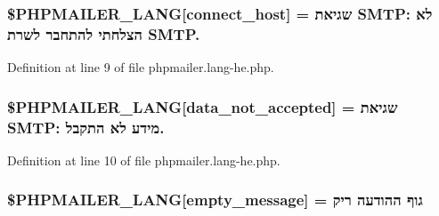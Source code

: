 \subsubsection[{\texorpdfstring{\$\+P\+H\+P\+M\+A\+I\+L\+E\+R\+\_\+\+L\+A\+NG}{$PHPMAILER_LANG}}]{\setlength{\rightskip}{0pt plus 5cm}\$P\+H\+P\+M\+A\+I\+L\+E\+R\+\_\+\+L\+A\+NG\mbox{[}\textquotesingle{}connect\+\_\+host\textquotesingle{}\mbox{]} = \textquotesingle{}שגיאת S\+M\+T\+P\+: לא הצלחתי להתחבר לשרת S\+M\+T\+P.\textquotesingle{}}\hypertarget{phpmailer_8lang-he_8php_a2ee0cc637a06b96e45600db31c6799ee}{}\label{phpmailer_8lang-he_8php_a2ee0cc637a06b96e45600db31c6799ee}


Definition at line 9 of file phpmailer.\+lang-\/he.\+php.

\subsubsection[{\texorpdfstring{\$\+P\+H\+P\+M\+A\+I\+L\+E\+R\+\_\+\+L\+A\+NG}{$PHPMAILER_LANG}}]{\setlength{\rightskip}{0pt plus 5cm}\$P\+H\+P\+M\+A\+I\+L\+E\+R\+\_\+\+L\+A\+NG\mbox{[}\textquotesingle{}data\+\_\+not\+\_\+accepted\textquotesingle{}\mbox{]} = \textquotesingle{}שגיאת S\+M\+T\+P\+: מידע לא התקבל.\textquotesingle{}}\hypertarget{phpmailer_8lang-he_8php_a814c6b191205d2361b3233e9c9d6fda5}{}\label{phpmailer_8lang-he_8php_a814c6b191205d2361b3233e9c9d6fda5}


Definition at line 10 of file phpmailer.\+lang-\/he.\+php.

\subsubsection[{\texorpdfstring{\$\+P\+H\+P\+M\+A\+I\+L\+E\+R\+\_\+\+L\+A\+NG}{$PHPMAILER_LANG}}]{\setlength{\rightskip}{0pt plus 5cm}\$P\+H\+P\+M\+A\+I\+L\+E\+R\+\_\+\+L\+A\+NG\mbox{[}\textquotesingle{}empty\+\_\+message\textquotesingle{}\mbox{]} = \textquotesingle{}גוף ההודעה ריק\textquotesingle{}}\hypertarget{phpmailer_8lang-he_8php_a33772099f637c9d6c2cd7425e0e37fed}{}\label{phpmailer_8lang-he_8php_a33772099f637c9d6c2cd7425e0e37fed}


